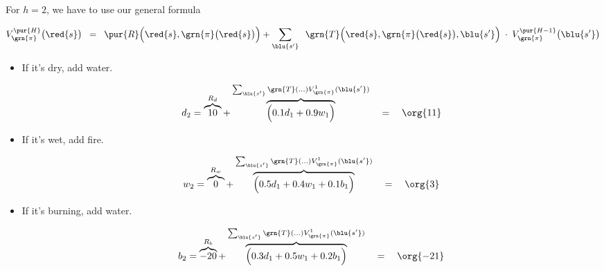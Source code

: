         \subsecdiv

            For $h=2$, we have to use our general formula

            \begin{equation*}
                V_{\grn{\pi}}^{\pur{H}}\big(\red{s} \big) \;\;=\;\; 
                        \pur{R} \Big( \red{s},\grn{\pi}\big(\red{s}\big) \Big)
                    +
                        \sum_{\blu{s'}}  
                            \;\;
                            \grn{T} \Big(          \red{s},\grn{\pi}\big(\red{s}\big),\blu{s'} \Big)
                            \;\cdot\; 
                            V_{\grn{\pi}}^{\pur{H-1}}\big(\blu{s'} \big)
            \end{equation*}

        \begin{itemize}
            \item If it's dry, add water.

        \begin{equation}
            d_2 =  
            \overbrace{10}^{R_d} +  
            \overbrace{
            \Big(
                0.1 d_1 + 
                0.9 w_1
            \Big)
            }^{\sum_{\blu{s'}}  
                \grn{T}(...)
                V_{\grn{\pi}}^1(\blu{s'} )}
            \quad = \quad
            \org{11}
        \end{equation}
        
        
        \item If it's wet, add fire.
        
        \begin{equation}
            w_2 = 
            \overbrace{0}^{R_w} + 
            \overbrace{
            \Big(
                0.5d_1 + 0.4w_1 + 0.1b_1
            \Big)
            }^{\sum_{\blu{s'}}  
                \grn{T}(...)
                V_{\grn{\pi}}^1(\blu{s'} )}
            \quad=\quad
            \org{3}
        \end{equation}

        \item If it's burning, add water.

        \begin{equation}
            b_2 = 
            \overbrace{-20}^{R_b} +  
            \overbrace{
            \Big(
                0.3d_1+0.5w_1+0.2b_1
            \Big)
            }^{\sum_{\blu{s'}}  
                \grn{T}(...)
                V_{\grn{\pi}}^1(\blu{s'} )}
            \quad=\quad
            \org{-21}
        \end{equation}

        \end{itemize}

